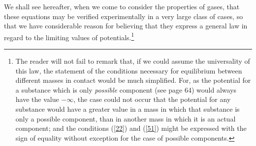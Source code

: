 \documentclass[12pt]{article}
\begin{document}
We shall see hereafter, when we come to consider the properties of gases, that these equations may be verified experimentally in a very large class of cases, so that we have considerable reason for believing that they express a general law in regard to the limiting values of potentials.\footnote{The reader will not fail to remark that, if we could assume the universality of this law, the statement of the conditions necessary for equilibrium between different masses in contact would be much simplified. For, as the potential for a substance which is only \textit{possible} component (see page 64) would always have the value $-\infty$, the case could not occur that the potential for any substance would have a greater value in a mass in which that substance is only a possible component, than in another mass in which it is an actual component; and the conditions (\ref{22}) and (\ref{51}) might be expressed with the sign of equality without exception for the case of possible components.}

\end{document}
